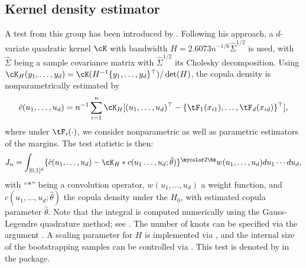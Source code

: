 \subsection{Kernel density estimator}\label{subsec:gof_Kernel}
\label{subsec:kernel_density_est}
A test from this group has been introduced by \citet{scaillet_2007}. Following his approach, a $d$-variate quadratic kernel $\cK$ with bandwidth $H = 2.6073n^{-1/6} \widehat{\Sigma}^{1/2}$ is used, with $\widehat{\Sigma}$ being a sample covariance matrix with $\widehat \Sigma^{1/2}$ its Cholesky decomposition. Using $\cK_H(y_1,\ldots,y_d) = \cK(H^{-1}\{y_1,\ldots, y_d\}^\top)/\det(H)$, the copula density is nonparametrically estimated by 
\begin{equation*}
\hat c(u_1, \ldots, u_d) = n^{-1}\sum_{i=1}^n \cK_H[(u_1,\ldots, u_d)^\top - \{\tF_{1}(x_{i1}), \ldots, \tF_{d}(x_{id})\}^{\top}],
\end{equation*}
where under $\tF_{i}(\cdot)$, we consider nonparametric as well as parametric estimators of the margins. The test statistic is then:
\begin{equation}\label{Kernel_estimator}
J_n = \int_{[0,1]^d}\{\hat c(u_1, \ldots, u_d) - \cK_H * c(u_1\ldots,u_d;\hat\theta)\}^{\mycolor 2\bk} w(u_1,\ldots, u_d)du_1\cdots du_d,
\end{equation}
with ``$*$'' being a convolution operator, $w(u_1,\ldots, u_d)$ a weight function, and $c(u_1,\ldots, u_d;\hat\theta)$ the copula density under the $H_0$, with estimated copula parameter $\hat\theta$. Note that the integral is computed numerically using the Gauss-Legendre quadrature method; see \citet{scaillet_2007}. The number of knots can be specified via the argument . A scaling parameter for $H$ is implemented via , and the internal size of the bootstrapping samples can be controlled via . \mycolor This test is denoted by  in the package. \bk

